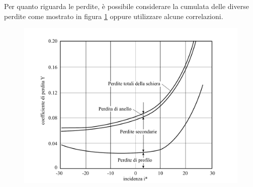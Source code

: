 Per quanto riguarda le perdite, è possibile considerare la cumulata delle diverse perdite come mostrato in figura \ref{fig:PerditeSchiera} oppure utilizzare alcune correlazioni. 
\begin{figure}
\centering
  \includegraphics[width=.65\textwidth]{fig/PerditeSchiera.pdf}
\caption{}
\label{fig:PerditeSchiera}
\end{figure}

